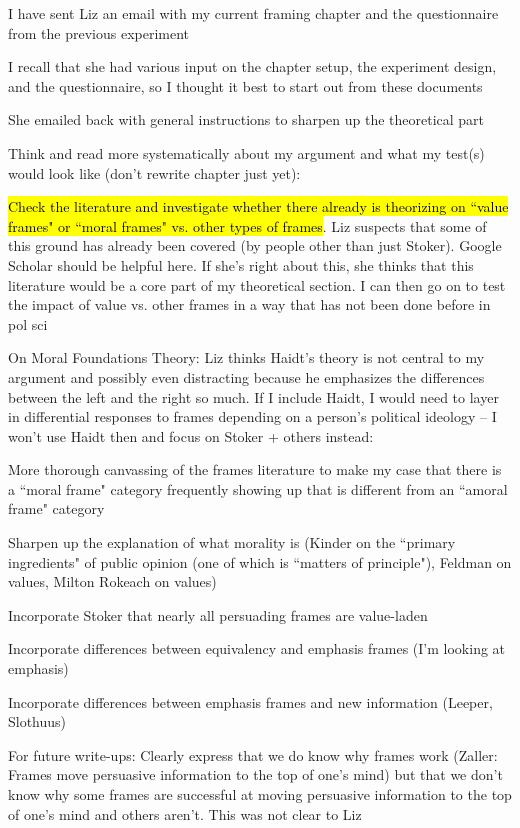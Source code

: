 	\begin{coi}
		\item I have sent Liz an email with my current framing chapter and the questionnaire from the previous experiment
		\item I recall that she had various input on the chapter setup, the experiment design, and the questionnaire, so I thought it best to start out from these documents
		\item She emailed back with general instructions to sharpen up the theoretical part
		\item Think and read more systematically about my argument and what my test(s) would look like (don't rewrite chapter just yet):
			\begin{coi}
				\item \hl{Check the literature and investigate whether there already is theorizing on ``value frames" or ``moral frames" vs. other types of frames}. Liz suspects that some of this ground has already been covered (by people other than just Stoker). Google Scholar should be helpful here. If she's right about this, she thinks that this literature would be a core part of my theoretical section. I can then go on to test the impact of value vs. other frames in a way that has not been done before in pol sci
				\item On Moral Foundations Theory: Liz thinks Haidt's theory is not central to my argument and possibly even distracting because he emphasizes the differences between the left and the right so much. If I include Haidt, I would need to layer in differential responses to frames depending on a person's political ideology -- I won't use Haidt then and focus on Stoker + others instead:
					\begin{coi}
						\item More thorough canvassing of the frames literature to make my case that there is a ``moral frame" category frequently showing up that is different from an ``amoral frame" category
						\item Sharpen up the explanation of what morality is (Kinder on the ``primary ingredients" of public opinion (one of which is ``matters of principle"), Feldman on values, Milton Rokeach on values)
						\item Incorporate Stoker that nearly all persuading frames are value-laden
					\end{coi}
				\item Incorporate differences between equivalency and emphasis frames (I'm looking at emphasis)
				\item Incorporate differences between emphasis frames and new information (Leeper, Slothuus)
			\end{coi}
		\item For future write-ups: Clearly express that we do know why frames work (Zaller: Frames move persuasive information to the top of one's mind) but that we don't know why some frames are successful at moving persuasive information to the top of one's mind and others aren't. This was not clear to Liz
	\end{coi}















